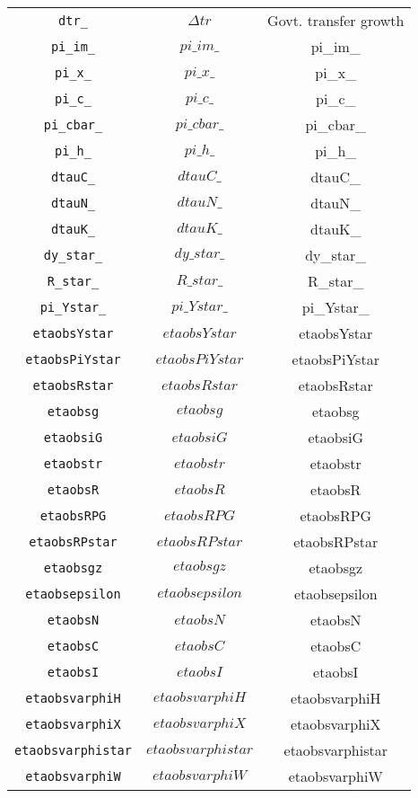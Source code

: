 \begin{center}
\begin{longtable}{ccc}
\texttt{dtr\_} & $\Delta{tr}$ & Govt. transfer growth\\
\texttt{pi\_im\_} & $pi\_im\_$ & pi\_im\_\\
\texttt{pi\_x\_} & $pi\_x\_$ & pi\_x\_\\
\texttt{pi\_c\_} & $pi\_c\_$ & pi\_c\_\\
\texttt{pi\_cbar\_} & $pi\_cbar\_$ & pi\_cbar\_\\
\texttt{pi\_h\_} & $pi\_h\_$ & pi\_h\_\\
\texttt{dtauC\_} & $dtauC\_$ & dtauC\_\\
\texttt{dtauN\_} & $dtauN\_$ & dtauN\_\\
\texttt{dtauK\_} & $dtauK\_$ & dtauK\_\\
\texttt{dy\_star\_} & $dy\_star\_$ & dy\_star\_\\
\texttt{R\_star\_} & $R\_star\_$ & R\_star\_\\
\texttt{pi\_Ystar\_} & $pi\_Ystar\_$ & pi\_Ystar\_\\
\texttt{etaobsYstar} & $etaobsYstar$ & etaobsYstar\\
\texttt{etaobsPiYstar} & $etaobsPiYstar$ & etaobsPiYstar\\
\texttt{etaobsRstar} & $etaobsRstar$ & etaobsRstar\\
\texttt{etaobsg} & $etaobsg$ & etaobsg\\
\texttt{etaobsiG} & $etaobsiG$ & etaobsiG\\
\texttt{etaobstr} & $etaobstr$ & etaobstr\\
\texttt{etaobsR} & $etaobsR$ & etaobsR\\
\texttt{etaobsRPG} & $etaobsRPG$ & etaobsRPG\\
\texttt{etaobsRPstar} & $etaobsRPstar$ & etaobsRPstar\\
\texttt{etaobsgz} & $etaobsgz$ & etaobsgz\\
\texttt{etaobsepsilon} & $etaobsepsilon$ & etaobsepsilon\\
\texttt{etaobsN} & $etaobsN$ & etaobsN\\
\texttt{etaobsC} & $etaobsC$ & etaobsC\\
\texttt{etaobsI} & $etaobsI$ & etaobsI\\
\texttt{etaobsvarphiH} & $etaobsvarphiH$ & etaobsvarphiH\\
\texttt{etaobsvarphiX} & $etaobsvarphiX$ & etaobsvarphiX\\
\texttt{etaobsvarphistar} & $etaobsvarphistar$ & etaobsvarphistar\\
\texttt{etaobsvarphiW} & $etaobsvarphiW$ & etaobsvarphiW\\

\end{longtable}
\end{center}
